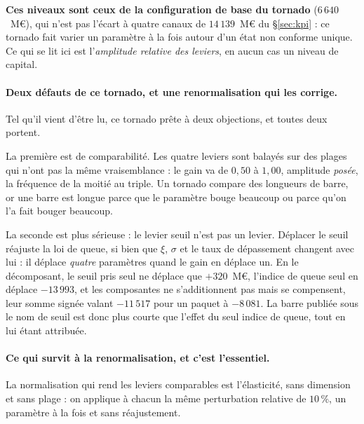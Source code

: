 \begin{attention}
\textbf{Ces niveaux sont ceux de la configuration de base du tornado} ($6\,640$~M\euro), qui
n'est pas l'écart à quatre canaux de $14\,139$~M\euro{} du \S\ref{sec:kpi} : ce tornado fait
varier un paramètre à la fois autour d'un état non conforme unique. Ce qui se lit ici est
l'\emph{amplitude relative des leviers}, en aucun cas un niveau de capital.
\end{attention}

\paragraph{Deux défauts de ce tornado, et une renormalisation qui les corrige.} Tel qu'il vient
d'être lu, ce tornado prête à deux objections, et toutes deux portent.

La première est de comparabilité. Les quatre leviers sont balayés sur des plages qui
n'ont pas la même vraisemblance : le gain va de $0{,}50$ à $1{,}00$, amplitude \emph{posée}, la
fréquence de la moitié au triple. Un tornado compare des longueurs de barre, or une barre est
longue parce que le paramètre bouge beaucoup ou parce qu'on l'a fait bouger beaucoup.

La seconde est plus sérieuse : le levier \og seuil\fg{} n'est pas un levier. Déplacer le
seuil réajuste la loi de queue, si bien que $\xi$, $\sigma$ et le taux de dépassement changent
avec lui : il déplace \emph{quatre} paramètres quand le gain en déplace un. En le décomposant, le
seuil pris seul ne déplace que $+320$~M\euro, l'indice de queue seul en déplace $-13\,993$, et
les composantes ne s'additionnent pas mais se compensent, leur somme signée valant
$-11\,517$ pour un paquet à $-8\,081$. La barre publiée sous le nom de \og seuil\fg{} est donc plus
courte que l'effet du seul indice de queue, tout en lui étant attribuée.

\paragraph{Ce qui survit à la renormalisation, et c'est l'essentiel.} La normalisation qui rend
les leviers comparables est l'élasticité, sans dimension et sans plage : on applique à
chacun la même perturbation relative de $10\,\%$, un paramètre à la fois et sans réajustement.

